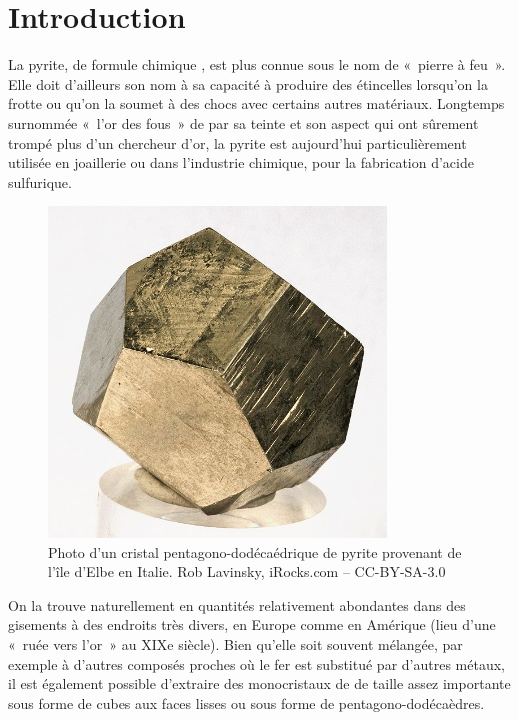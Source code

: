 \section{Introduction}

La pyrite, de formule chimique , est plus connue sous le nom de «~pierre à feu~». Elle doit d'ailleurs son nom à sa capacité à produire des étincelles lorsqu'on la frotte ou qu'on la soumet à des chocs avec certains autres matériaux. Longtemps surnommée «~l'or des fous~» de par sa teinte et son aspect qui ont sûrement trompé plus d'un chercheur d'or, la pyrite est aujourd'hui particulièrement utilisée en joaillerie ou dans l'industrie chimique, pour la fabrication d'acide sulfurique.

\begin{figure}
\caption{Photo d'un cristal pentagono-dodécaédrique de pyrite provenant de l'île d'Elbe en Italie. Rob Lavinsky, iRocks.com – CC-BY-SA-3.0}
\includegraphics[width=0.8\textwidth]{figures/Pyrite_photo}
\end{figure}

On la trouve naturellement en quantités relativement abondantes dans des gisements à des endroits très divers, en Europe comme en Amérique (lieu d'une «~ruée vers l'or~» au XIXe siècle). Bien qu'elle soit souvent mélangée, par exemple à d'autres composés proches où le fer est substitué par d'autres métaux, il est également possible d'extraire des monocristaux de  de taille assez importante sous forme de cubes aux faces lisses ou sous forme de pentagono-dodécaèdres.


